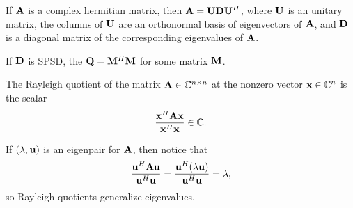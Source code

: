\begin{theorem}{}{}
    If $\bold{A}$ is a complex hermitian matrix, then $\bold{A}=\bold{U}\bold{D}\bold{U}^H$,
    where $\bold{U}$ is an unitary matrix, the columns of $\bold{U}$ are an orthonormal basis of eigenvectors of $\bold{A}$,
    and $\bold{D}$ is a diagonal matrix of the corresponding eigenvalues of $\bold{A}$.
\end{theorem}

\begin{proposition}{}{}
    If $\bold{D}$ is SPSD, the $\bold{Q}=\bold{M}^H\bold{M}$ for some matrix $\bold{M}$.
\end{proposition}

\begin{definition}{}{}
    The Rayleigh quotient of the matrix $\bold{A}\in \mathbb{C}^{n\times n}$ at the nonzero vector $\bold{x}\in \mathbb{C}^{n}$
    is the scalar
    \begin{align*}
        \frac{\bold{x}^H\bold{A}\bold{x}}{\bold{x}^H\bold{x}}\in \mathbb{C}.
    \end{align*}
\end{definition}
\begin{remark}
    If $(\lambda,\bold{u})$ is an eigenpair for $\bold{A}$, then notice that
    \begin{align*}
        \frac{\bold{u}^H\bold{A}\bold{u}}{\bold{u}^H\bold{u}}=\frac{\bold{u}^H(\lambda \bold{u})}{\bold{u}^H\bold{u}}=\lambda,
    \end{align*}
    so Rayleigh quotients generalize eigenvalues.
\end{remark}
